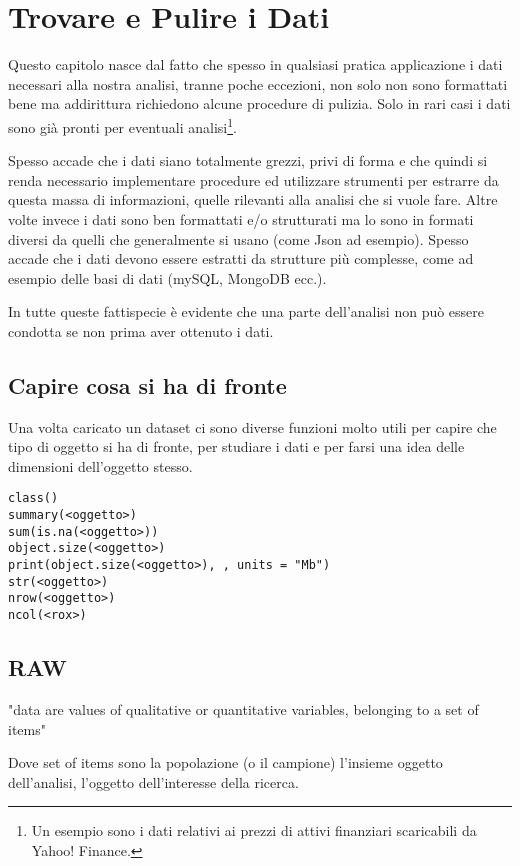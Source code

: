 \chapter{Trovare e Pulire i Dati}
Questo capitolo nasce dal fatto che spesso in qualsiasi pratica applicazione i dati necessari alla nostra analisi, tranne poche eccezioni, non solo non sono formattati bene ma addirittura richiedono alcune procedure di pulizia. Solo in rari casi i dati sono già pronti per eventuali analisi\footnote{Un esempio sono i dati relativi ai prezzi di attivi finanziari scaricabili da Yahoo! Finance.}.

Spesso accade che i dati siano totalmente grezzi, privi di forma e che quindi si renda necessario implementare procedure ed utilizzare strumenti per estrarre da questa massa  di informazioni, quelle rilevanti alla analisi che si vuole fare. Altre volte invece i dati sono ben formattati e/o strutturati ma lo sono in formati
diversi da quelli che generalmente si usano (come Json ad esempio). Spesso accade che i dati devono essere estratti da strutture più complesse, come ad esempio delle basi di dati (mySQL, MongoDB ecc.).

In tutte queste fattispecie è evidente che una parte dell'analisi non può essere condotta se non prima aver ottenuto i dati.


\section{Capire cosa si ha di fronte}
Una volta caricato un dataset ci sono diverse funzioni molto utili per capire che tipo di oggetto si ha di fronte, per studiare i dati e per farsi una idea delle dimensioni dell'oggetto stesso.
\begin{lstlisting}
class()
summary(<oggetto>)
sum(is.na(<oggetto>))
object.size(<oggetto>)
print(object.size(<oggetto>), , units = "Mb")
str(<oggetto>)
nrow(<oggetto>)
ncol(<rox>)
\end{lstlisting}

\section{RAW}

"data are values of qualitative or quantitative variables, belonging to a set of items"

Dove set of items sono la popolazione (o il campione) l'insieme oggetto dell'analisi, l'oggetto dell'interesse della ricerca.


